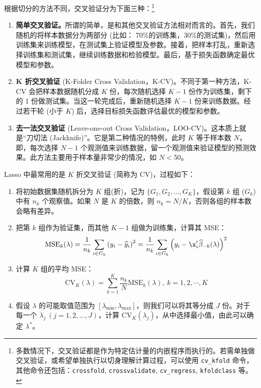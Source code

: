 
根据切分的方法不同，交叉验证分为下面三种：\footnote{%
   多数情况下，交叉验证都是作为特定估计量的内嵌程序而执行的。若需单独做交叉验证，或希望单独执行以切身理解计算过程，可以使用 \texttt{cv\_kfold} 命令，其他命令还包括：\texttt{crossfold}, \texttt{crossvalidate},  \texttt{cv\_regress}, \texttt{kfoldclass} 等。
}

\begin{enumerate}
\item \textbf{简单交叉验证。}所谓的简单，是和其他交叉验证方法相对而言的。首先，我们随机的将样本数据分为两部分 (比如： 70\%的训练集，30\%的测试集)，然后用训练集来训练模型，在测试集上验证模型及参数。接着，把样本打乱，重新选择训练集和测试集，继续训练数据和检验模型。最后，基于损失函数确定最优模型和参数。
\item \textbf{K 折交叉验证} (K-Folder Cross Validation，K-CV)。不同于第一种方法，K-CV 会把样本数据随机分成 $K$ 份，每次随机选择 $K-1$ 份作为训练集，剩下的 1 份做测试集。当这一轮完成后，重新随机选择 $K-1$ 份来训练数据。经过若干轮 (小于 $K$) 后，选择目标损失函数评估最优的模型和参数。
\item \textbf{去一法交叉验证} (Leave-one-out Cross Validation，LOO-CV)。这本质上就是“刀切法 (Jackknife)”。它是第二种情况的特例，此时 $K$ 等于样本数 $N$，即，每次选择 $N-1$ 个观测值来训练数据，留一个观测值来验证模型的预测效果。此方法主要用于样本量非常少的情况，如 $N<50$。
\end{enumerate}

Lasso 中最常用的是 $K$ 折交叉验证 (简称为 CV)，过程如下：
\begin{enumerate}
\item 将初始数据集随机拆分为 $K$ 组(折)，记为 $\{G_{1}, G_{2}, \ldots,G_{K}\}$，假设第 $k$ 组 ($G_{k}$) 中有 $n_{k}$ 个观察值。如果 $N$ 是 $K$ 的倍数，则 $n_{k}=N / K$，否则各组的样本数会略有差异。
\item 把第 $k$ 组作为验证集，而其他 $K-1$ 组做为训练集，计算其 MSE：
$$
\mathrm{MSE}_{k}(\lambda) =
\frac{1}{n_k}\sum_{i \in G_{k}}\left(y_{i}-\widehat{y}_{i}\right)^{2}
= \frac{1}{n_k}\sum_{i \in G_{k}}\left(y_{i}-\x_i' \widehat{\beta}_{-k}(\lambda)\right)^{2}
$$
\item 计算 $K$ 组的平均 MSE：
$$
\mathrm{CV}_{K}(\lambda)=\sum_{k=1}^{K} \frac{n_{k}}{N} \mathrm{MSE}_{k}(\lambda), \  k=1,2,\cdots,K
$$
\item 假设 $\lambda$ 的可能取值范围为 $[\lambda_{\text{min}},\lambda_{\text{max}}]$，则我们可以将其等分成 $J$ 份。对于每一个 $\lambda_j\ (j=1,2,\ldots,J)$，计算 $\mathrm{CV}_{K}(\lambda_j)$，从中选择最小值，由此可以确定 $\lambda^*$。
\end{enumerate}

